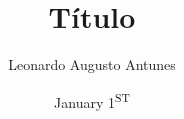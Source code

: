 \documentclass{ASD_LaTeX}
\author{Leonardo Augusto Antunes}
\title{Título}
\date{January 1\textsuperscript{ST}}
\begin{document}
    
    \biblio
    
\end{document}
